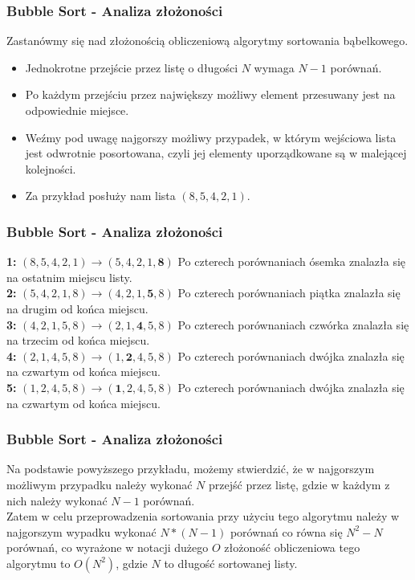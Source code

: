 \documentclass[kslide.tex]{subfiles}
\begin{document}
\begin{frame}
\frametitle{Bubble Sort - Analiza złożoności}
        Zastanówmy się nad złożonością obliczeniową algorytmy sortowania bąbelkowego. 
        \begin{itemize}
            \item<1-> Jednokrotne przejście przez listę o długości $N$ wymaga $N - 1$ porównań.
            \item<2-> Po każdym przejściu przez największy możliwy element przesuwany jest na odpowiednie miejsce.
            \item<3->  Weźmy pod uwagę najgorszy możliwy przypadek, w którym wejściowa lista jest odwrotnie posortowana, czyli jej elementy uporządkowane są w malejącej kolejności.
            \item<4->  Za przykład posłuży nam lista $( 8, 5, 4, 2, 1 )$.
        \end{itemize} 
\end{frame}

\begin{frame}
\frametitle{Bubble Sort - Analiza złożoności}
    \textbf{1:} $( 8, 5, 4, 2, 1 ) \rightarrow ( 5, 4, 2, 1, \textbf{8} )$ Po czterech porównaniach ósemka znalazła się na ostatnim miejscu listy.\\[0.1cm]
    \pause
    \textbf{2:} $( 5,4,2,1,8 ) \rightarrow ( 4, 2, 1, \textbf{5}, 8 )$ Po czterech porównaniach piątka znalazła się na drugim od końca miejscu.\\[0.1cm]
    \pause
    \textbf{3:} $( 4, 2, 1, 5, 8 ) \rightarrow ( 2, 1, \textbf{4}, 5, 8 )$ Po czterech porównaniach czwórka znalazła się na trzecim od końca miejscu.\\[0.1cm]
    \pause
    \textbf{4:} $( 2, 1, 4, 5, 8 ) \rightarrow ( 1, \textbf{2}, 4, 5, 8 )$ Po czterech porównaniach dwójka znalazła się na czwartym od końca miejscu.\\[0.1cm]
    \pause
    \textbf{5:} $( 1, 2, 4, 5, 8 ) \rightarrow ( \textbf{1}, 2, 4, 5, 8 )$ Po czterech porównaniach dwójka znalazła się na czwartym od końca miejscu.
\end{frame}

\begin{frame}
\frametitle{Bubble Sort - Analiza złożoności}

Na podstawie powyższego przykładu, możemy stwierdzić, że w najgorszym możliwym przypadku należy wykonać $N$ przejść przez listę, gdzie w każdym z nich należy wykonać $N - 1$ porównań.\\[0.3cm]

Zatem w celu przeprowadzenia sortowania przy użyciu tego algorytmu należy w najgorszym wypadku wykonać $N * (N - 1)$ porównań co równa się $N^2 - N$ porównań, co wyrażone w notacji dużego $O$ złożoność obliczeniowa tego algorytmu to $O(N^2)$, gdzie $N$ to długość sortowanej listy.
\end{frame}
\end{document}
